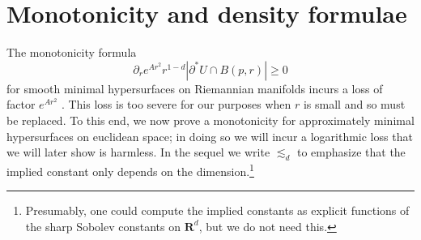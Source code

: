 \documentclass[reqno,12pt,letterpaper]{amsart}
\newcommand{\RR}{\mathbf{R}}
\theoremstyle{definition}
\numberwithin{equation}{section}
\begin{document}


\section{Monotonicity and density formulae}\label{inequalities}
The monotonicity formula
\begin{equation}\label{classic monotonicity formula}
\partial_r e^{Ar^2}r^{1 - d} |\partial^* U \cap B(p, r)| \geq 0
\end{equation}
for smooth minimal hypersurfaces on Riemannian manifolds incurs a loss of factor $e^{Ar^2}$ \cite[\S7]{MarquesXX}.
This loss is too severe for our purposes when $r$ is small and so must be replaced.
To this end, we now prove a monotonicity for approximately minimal hypersurfaces on euclidean space; in doing so we will incur a logarithmic loss that we will later show is harmless.
In the sequel we write $\lesssim_d$ to emphasize that the implied constant only depends on the dimension.\footnote{Presumably, one could compute the implied constants as explicit functions of the sharp Sobolev constants on $\RR^d$, but we do not need this.}
\end{document}
